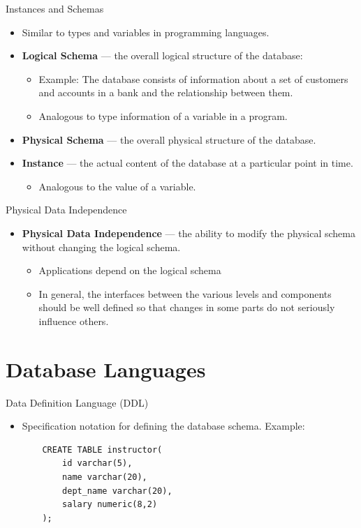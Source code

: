 \documentclass[aspectratio=169]{beamer}
\begin{document}
\begin{frame}{Instances and Schemas}
    \begin{itemize}
        \item Similar to types and variables in programming languages.
        \item \textbf{Logical Schema} --- the overall logical structure of the database:
        \begin{itemize}
            \item Example: The database consists of information about a set of customers and accounts in a bank and the relationship between them.
            \item Analogous to type information of a variable in a program.
        \end{itemize}
        \item \textbf{Physical Schema} --- the overall physical structure of the database.
        \item \textbf{Instance} --- the actual content of the database at a particular point in time.
        \begin{itemize}
            \item Analogous to the value of a variable.
        \end{itemize}
    \end{itemize}
\end{frame}

\begin{frame}{Physical Data Independence}
    \begin{itemize}
        \item \textbf{Physical Data Independence} --- the ability to modify the physical schema without changing the logical schema.
        \begin{itemize}
            \item Applications depend on the logical schema
            \item In general, the interfaces between the various levels and components should be well defined so that changes in some parts do not seriously influence others.
        \end{itemize}
    \end{itemize}
\end{frame}

\section{Database Languages}

\begin{frame}[fragile]{Data Definition Language (DDL)}
    \begin{itemize}
        \item Specification notation for defining the database schema.  Example:
        \begin{verbatim}
    CREATE TABLE instructor(
        id varchar(5),
        name varchar(20),
        dept_name varchar(20),
        salary numeric(8,2)
    );
        \end{verbatim}
    \end{itemize}
\end{frame}
\end{document}
